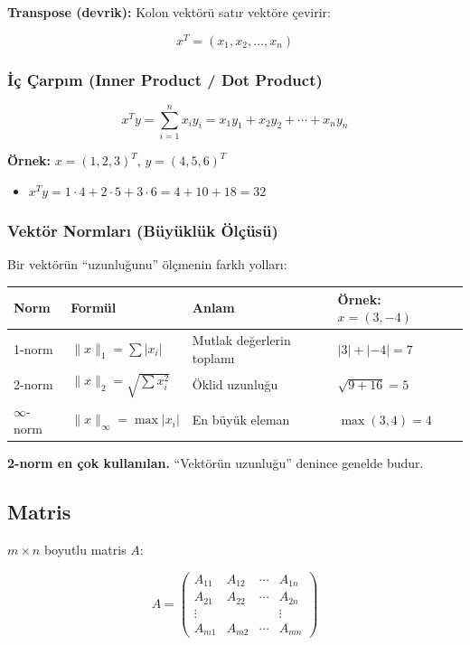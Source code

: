 \documentclass[12pt,a4paper]{article}
\theoremstyle{definition}
\theoremstyle{remark}
\begin{document}
\textbf{Transpose (devrik):} Kolon vekt\"or\"u sat{\i}r vekt\"ore \c{c}evirir:

\[
x^T = (x_1, x_2, \ldots, x_n)
\]

\subsubsection{\.{I}\c{c} \c{C}arp{\i}m (Inner Product / Dot Product)}

\[
x^T y = \sum_{i=1}^{n} x_i y_i = x_1 y_1 + x_2 y_2 + \cdots + x_n y_n
\]

\textbf{\"Ornek:} $x = (1, 2, 3)^T$, $y = (4, 5, 6)^T$
\begin{itemize}
    \item $x^T y = 1 \cdot 4 + 2 \cdot 5 + 3 \cdot 6 = 4 + 10 + 18 = 32$
\end{itemize}

\subsubsection{Vekt\"or Normlar{\i} (B\"uy\"ukl\"uk \"Ol\c{c}\"us\"u)}

Bir vekt\"or\"un ``uzunlu\u{g}unu'' \"ol\c{c}menin farkl{\i} yollar{\i}:

\begin{table}[h]
\centering
\begin{tabular}{@{}llll@{}}
\toprule
\textbf{Norm} & \textbf{Form\"ul} & \textbf{Anlam} & \textbf{\"Ornek: $x = (3, -4)$} \\
\midrule
1-norm & $\|x\|_1 = \sum |x_i|$ & Mutlak de\u{g}erlerin toplam{\i} & $|3| + |-4| = 7$ \\
2-norm & $\|x\|_2 = \sqrt{\sum x_i^2}$ & \"Oklid uzunlu\u{g}u & $\sqrt{9+16} = 5$ \\
$\infty$-norm & $\|x\|_\infty = \max |x_i|$ & En b\"uy\"uk eleman & $\max(3, 4) = 4$ \\
\bottomrule
\end{tabular}
\end{table}

\textbf{2-norm en \c{c}ok kullan{\i}lan.} ``Vekt\"or\"un uzunlu\u{g}u'' denince genelde budur.

\subsection{Matris}

$m \times n$ boyutlu matris $A$:

\[
A = \begin{pmatrix} A_{11} & A_{12} & \cdots & A_{1n} \\ A_{21} & A_{22} & \cdots & A_{2n} \\ \vdots & & & \vdots \\ A_{m1} & A_{m2} & \cdots & A_{mn} \end{pmatrix}
\]
\end{document}
